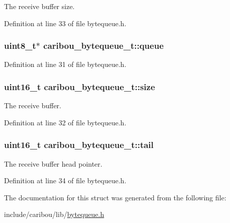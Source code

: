 The receive buffer size. 



Definition at line 33 of file bytequeue.\-h.

\hypertarget{structcaribou__bytequeue__t_a4a4aa3f8ed5e7e7e66f7da7a2cb7720e}{
\subsubsection[{queue}]{\setlength{\rightskip}{0pt plus 5cm}uint8\-\_\-t$\ast$ caribou\-\_\-bytequeue\-\_\-t\-::queue}}\label{structcaribou__bytequeue__t_a4a4aa3f8ed5e7e7e66f7da7a2cb7720e}


Definition at line 31 of file bytequeue.\-h.

\hypertarget{structcaribou__bytequeue__t_a0f88b0ee081def2ac171173e3e520980}{
\subsubsection[{size}]{\setlength{\rightskip}{0pt plus 5cm}uint16\-\_\-t caribou\-\_\-bytequeue\-\_\-t\-::size}}\label{structcaribou__bytequeue__t_a0f88b0ee081def2ac171173e3e520980}


The receive buffer. 



Definition at line 32 of file bytequeue.\-h.

\hypertarget{structcaribou__bytequeue__t_a566eaeca029373cd7f187cc2e622b3f8}{
\subsubsection[{tail}]{\setlength{\rightskip}{0pt plus 5cm}uint16\-\_\-t caribou\-\_\-bytequeue\-\_\-t\-::tail}}\label{structcaribou__bytequeue__t_a566eaeca029373cd7f187cc2e622b3f8}


The receive buffer head pointer. 



Definition at line 34 of file bytequeue.\-h.



The documentation for this struct was generated from the following file\-:\begin{DoxyCompactItemize}
\item 
include/caribou/lib/\hyperlink{bytequeue_8h}{bytequeue.\-h}\end{DoxyCompactItemize}
